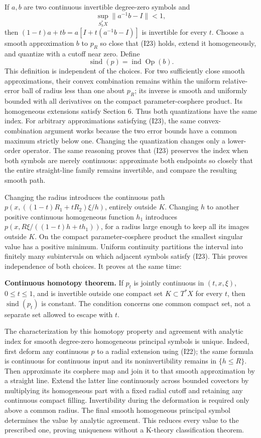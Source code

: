 \documentclass[
  11pt,
]{article}
\begin{document}
If \(a,b\) are two continuous invertible degree-zero symbols and \[
\sup_{S_h^*X}\|a^{-1}b-I\|<1,
\tag{I23}
\] then \((1-t)a+tb=a[I+t(a^{-1}b-I)]\) is invertible for every \(t\).
Choose a smooth approximation \(b\) to \(p_R\) so close that (I23)
holds, extend it homogeneously, and quantize with a cutoff near zero.
Define \[
\operatorname{sind}(p)=\operatorname{ind}\operatorname{Op}(b).
\tag{I24}
\] This definition is independent of the choices. For two sufficiently
close smooth approximations, their convex combination remains within the
uniform relative-error ball of radius less than one about \(p_R\); its
inverse is smooth and uniformly bounded with all derivatives on the
compact parameter-cosphere product. Its homogeneous extensions satisfy
Section 6. Thus both quantizations have the same index. For arbitrary
approximations satisfying (I23), the same convex-combination argument
works because the two error bounds have a common maximum strictly below
one. Changing the quantization changes only a lower-order operator. The
same reasoning proves that (I23) preserves the index when both symbols
are merely continuous: approximate both endpoints so closely that the
entire straight-line family remains invertible, and compare the
resulting smooth path.

Changing the radius introduces the continuous path
\(p(x,((1-t)R_1+tR_2)\xi/h)\), entirely outside \(K\). Changing \(h\) to
another positive continuous homogeneous function \(h_1\) introduces
\(p(x,R\xi/((1-t)h+t h_1))\), for a radius large enough to keep all its
images outside \(K\). On the compact parameter-cosphere product the
smallest singular value has a positive minimum. Uniform continuity
partitions the interval into finitely many subintervals on which
adjacent symbols satisfy (I23). This proves independence of both
choices. It proves at the same time:

\textbf{Continuous homotopy theorem.} If \(p_t\) is jointly continuous
in \((t,x,\xi)\), \(0\leq t\leq1\), and is invertible outside one
compact set \(K\subset T^*X\) for every \(t\), then
\(\operatorname{sind}(p_t)\) is constant. The condition concerns one
common compact set, not a separate set allowed to escape with \(t\).

The characterization by this homotopy property and agreement with
analytic index for smooth degree-zero homogeneous principal symbols is
unique. Indeed, first deform any continuous \(p\) to a radial extension
using (I22); the same formula is continuous for continuous input and its
noninvertibility remains in \(\{h\leq R\}\). Then approximate its
cosphere map and join it to that smooth approximation by a straight
line. Extend the latter line continuously across bounded covectors by
multiplying its homogeneous part with a fixed radial cutoff and
retaining any continuous compact filling. Invertibility during the
deformation is required only above a common radius. The final smooth
homogeneous principal symbol determines the value by analytic agreement.
This reduces every value to the prescribed one, proving uniqueness
without a K-theory classification theorem.
\end{document}

